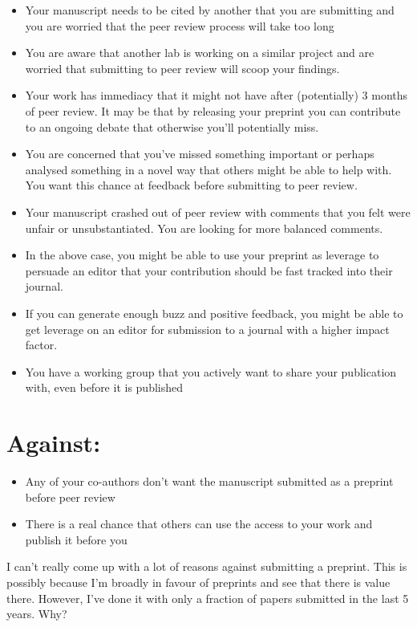 \documentclass[
]{krantz}
\providecommand{\tightlist}{%
  \setlength{\itemsep}{0pt}\setlength{\parskip}{0pt}}
\begin{document}
\begin{itemize}
\tightlist
\item
  Your manuscript needs to be cited by another that you are submitting and you are worried that the peer review process will take too long
\item
  You are aware that another lab is working on a similar project and are worried that submitting to peer review will scoop your findings.
\item
  Your work has immediacy that it might not have after (potentially) 3 months of peer review. It may be that by releasing your preprint you can contribute to an ongoing debate that otherwise you'll potentially miss.
\item
  You are concerned that you've missed something important or perhaps analysed something in a novel way that others might be able to help with. You want this chance at feedback before submitting to peer review.
\item
  Your manuscript crashed out of peer review with comments that you felt were unfair or unsubstantiated. You are looking for more balanced comments.
\item
  In the above case, you might be able to use your preprint as leverage to persuade an editor that your contribution should be fast tracked into their journal.
\item
  If you can generate enough buzz and positive feedback, you might be able to get leverage on an editor for submission to a journal with a higher impact factor.
\item
  You have a working group that you actively want to share your publication with, even before it is published
\end{itemize}

\hypertarget{against}{%
\section{Against:}\label{against}}

\begin{itemize}
\tightlist
\item
  Any of your co-authors don't want the manuscript submitted as a preprint before peer review
\item
  There is a real chance that others can use the access to your work and publish it before you
\end{itemize}

I can't really come up with a lot of reasons against submitting a preprint. This is possibly because I'm broadly in favour of preprints and see that there is value there. However, I've done it with only a fraction of papers submitted in the last 5 years. Why?
\end{document}

